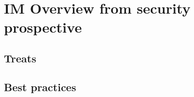 
\chapter{IM Overview from security prospective}\label{ch:overview-from-security-prospective}


\section{Treats}\label{sec:possible-treats}


\section{Best practices}\label{sec:implementations}